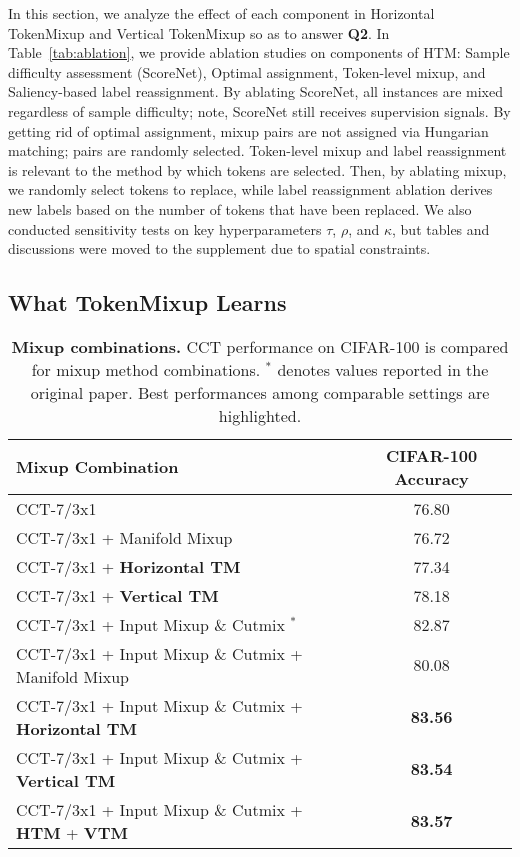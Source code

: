 \documentclass{article}
\begin{document}
In this section, we analyze the effect of each component in Horizontal TokenMixup and Vertical TokenMixup so as to answer \textbf{Q2}.
In Table~\ref{tab:ablation}, we provide ablation studies on components of HTM: Sample difficulty assessment (ScoreNet), Optimal assignment, Token-level mixup, and Saliency-based label reassignment.
By ablating ScoreNet, all instances are mixed regardless of sample difficulty; note, ScoreNet still receives supervision signals.
By getting rid of optimal assignment, mixup pairs are not assigned via Hungarian matching; pairs are randomly selected.
Token-level mixup and label reassignment is relevant to the method by which tokens are selected.
Then, by ablating mixup, we randomly select tokens to replace, while label reassignment ablation derives new labels based on the number of tokens that have been replaced.
We also conducted sensitivity tests on key hyperparameters $\tau$, $\rho$, and $\kappa$, but tables and discussions were moved to the supplement due to spatial constraints. 
\subsection{What TokenMixup Learns}
\label{sec:analysis_learn}
\begin{table}

\centering
\caption{\footnotesize \textbf{Mixup combinations.}  CCT performance on CIFAR-100 is compared for mixup method combinations. $^*$ denotes values reported in the original paper. Best performances among comparable settings are highlighted.}
\label{tab:manifold}
\begin{adjustbox}{width=0.7\textwidth}
\begin{tabular}{l | c}
\toprule
\textbf{Mixup Combination} & \textbf{CIFAR-100 Accuracy} \\
\midrule
CCT-7/3x1 & 76.80 \\
CCT-7/3x1 + Manifold Mixup & 76.72 \\
CCT-7/3x1 + \textbf{Horizontal TM} & 77.34 \\
CCT-7/3x1 + \textbf{Vertical TM} & \cellcolor{yellow!25} 78.18  \\
CCT-7/3x1 + Input Mixup \& Cutmix $^*$ & 82.87 \\
CCT-7/3x1 + Input Mixup \& Cutmix + Manifold Mixup & 80.08 \\
CCT-7/3x1 + Input Mixup \& Cutmix + \textbf{Horizontal TM} & \textbf{83.56} \\
CCT-7/3x1 + Input Mixup \& Cutmix + \textbf{Vertical TM} & \textbf{83.54} \\
CCT-7/3x1 + Input Mixup \& Cutmix + \textbf{HTM} + \textbf{VTM} & \cellcolor{yellow!25}\textbf{83.57} \\

\bottomrule
\end{tabular}
\end{adjustbox}

\end{table}
\end{document}
